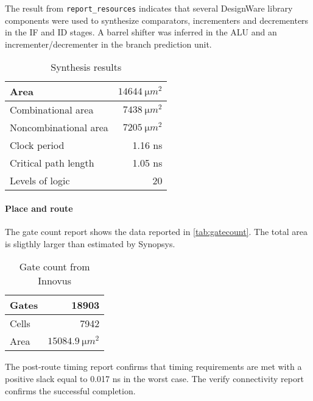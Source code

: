 The result from \texttt{report\_resources} indicates that several DesignWare library components were used to synthesize comparators, incrementers and decrementers in the IF and ID stages. A barrel shifter was inferred in the ALU and an incrementer/decrementer in the branch prediction unit.

\begin{table}[htbp]
	\centering
	\begin{tabular}{|l|r|}
		\hline
		Area & $\SI{14644}{\micro m^2}$\\\hline
		Combinational area & $\SI{7438}{\micro m^2}$\\\hline
		Noncombinational area & $\SI{7205}{\micro m^2}$\\\hline
		Clock period & 1.16 ns \\\hline
		Critical path length & 1.05 ns\\\hline
		Levels of logic & 20 \\\hline

	\end{tabular}
\caption{Synthesis results}
\label{tab:synres}
\end{table}

\paragraph{Place and route} The gate count report shows the data reported in \autoref{tab:gatecount}. The total area is sligthly larger than estimated by Synopsys.
\begin{table}[htbp]
	\centering
	\begin{tabular}{|l|r|}\hline
  Gates &     18903\\\hline Cells &   7942\\\hline Area &   $\SI{15084.9}{\micro m^2}$\\\hline
	\end{tabular}
	\caption{Gate count from Innovus}
	\label{tab:gatecount}
\end{table}

The post-route timing report confirms that timing requirements are met with a positive slack equal to 0.017 ns in the worst case. The verify connectivity report confirms the successful completion.

